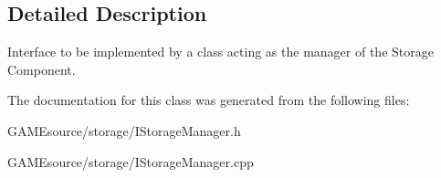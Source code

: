 \subsection{Detailed Description}
Interface to be implemented by a class acting as the manager of the Storage Component. 

The documentation for this class was generated from the following files\+:\begin{DoxyCompactItemize}
\item 
G\+A\+M\+Esource/storage/I\+Storage\+Manager.\+h\item 
G\+A\+M\+Esource/storage/I\+Storage\+Manager.\+cpp\end{DoxyCompactItemize}
